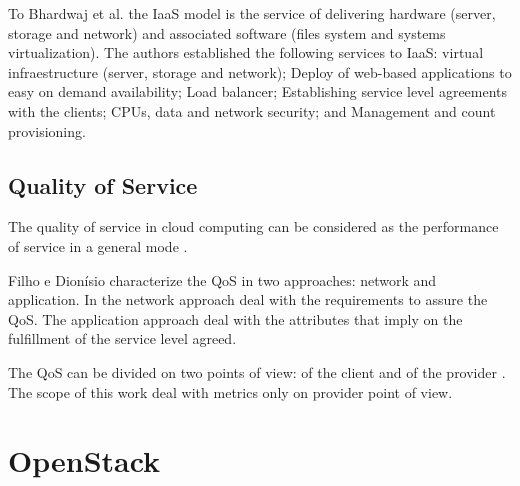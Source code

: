\documentclass[conference]{IEEEtran}
\begin{document}
To Bhardwaj et al. \cite{bhardwaj2010cloud} the IaaS model is the service of delivering hardware (server, storage and network) 
and associated software (files system and systems virtualization). The authors established the following services to IaaS: 
virtual infraestructure (server, storage and network); Deploy of web-based applications to easy on demand availability;
Load balancer; Establishing service level agreements with the clients; CPUs, data and network security; and Management and 
count provisioning.

\subsection{Quality of Service}


The quality of service in cloud computing can be considered as the performance of service in a general mode \cite{openstack}.


Filho e Dionísio \cite{leite2016influencia} characterize the QoS in two approaches: network and application. In the
network approach deal with the requirements to assure the QoS. The application approach deal with the attributes
that imply on the fulfillment of the service level agreed.


The QoS can be divided on two points of view: of the client and of the provider \cite{openstack, bhardwaj2010cloud}. The 
scope of this work deal with metrics only on provider point of view.


\section{OpenStack}
\end{document}
